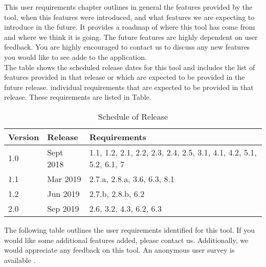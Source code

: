 This user requirements chapter outlines in general the features provided by the tool, when this features were introduced, and what features we are expecting to introduce in the future. It provides a roadmap of where this tool has come from and where we think it is going. The future features are highly dependent on user feedback. You are highly encouraged to contact us to discuss any new features you would like to see adde to the application. \\

The table shows the scheduled release dates for this tool and includes the list of features provided in that release or which are expected to be provided in the future release. individual requirements that are expected to be provided in that release. These requirements are listed in Table. 

\begin{table}[hbt!]                    
  \centering
\begin{adjustbox}{max width=\textwidth}            
  \begin{tabular}{lll}                    
    \toprule          
      Version & 	Release	 & Requirements \\  \hline
      1.0	& Sept 2018 &	1.1, 1.2, 2.1, 2.2, 2.3, 2.4, 2.5, 3.1, 4.1, 4.2, 5.1, 5.2, 6.1, 7\\  \hline
      1.1	 & Mar 2019 &	2.7.a, 2.8.a, 3.6, 6.3, 8.1\\  \hline
      1.2	 & Jun 2019 &	2.7.b, 2.8.b, 6.2 \\  \hline
      2.0	 & Sep 2019 &	2.6, 3.2, 4.3, 6.2, 6.3\\  \hline
  \end{tabular}
\end{adjustbox}
  \caption{Schedule of Release}             
  \label{tab:schedule}                 
\end{table}

The following table outlines the user requirements identified for this
tool. If you would like some additional features added, please contact us.
Additionally, we would appreciate any feedback on this tool. An anonymous
user survey is available .


